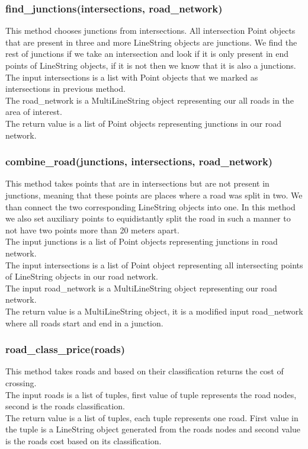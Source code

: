 \documentclass[oneside]{article}
\begin{document}
            \subsubsection{find\_junctions(intersections, road\_network)}
            This method chooses junctions from intersections. All intersection Point objects that are present in three and more LineString objects are junctions. We find the rest of junctions if we take an intersection and look if it is only present in end points of LineString objects, if it is not then we know that it is also a junctions.\\
            The input intersections is a list with Point objects that we marked as intersections in previous method.\\
            The road\_network is a MultiLineString object representing our all roads in the area of interest.\\
            The return value is a list of Point objects representing junctions in our road network.

            \subsubsection{combine\_road(junctions, intersections, road\_network)}
            This method takes points that are in intersections but are not present in junctions, meaning that these points are places where a road was split in two. We than connect the two corresponding LineString objects into one. In this method we also set auxiliary points to equidistantly split the road in such a manner to not have two points more than 20 meters apart.\\
            The input junctions is a list of Point objects representing junctions in road network.\\
            The input intersections is a list of Point object representing all intersecting points of LineString objects in our road network.\\
            The input road\_network is a MultiLineString object representing our road network.\\
            The return value is a MultiLineString object, it is a modified input road\_network where all roads start and end in a junction.

            \subsubsection{road\_class\_price(roads)}
            This method takes roads and based on their classification returns the cost of crossing.\\
            The input roads is a list of tuples, first value of tuple represents the road nodes, second is the roads classification.\\
            The return value is a list of tuples, each tuple represents one road. First value in the tuple is a LineString object generated from the roads nodes and second value is the roads cost based on its classification.
\end{document}
